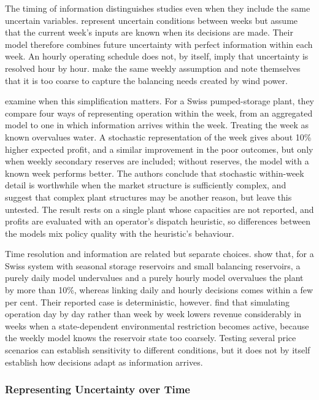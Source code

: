 The timing of information distinguishes studies even when they include
the same uncertain variables. \citet{bore2026assessing} represent
uncertain conditions between weeks but assume that the current week's
inputs are known when its decisions are made. Their model therefore
combines future uncertainty with perfect information within each week.
An hourly operating schedule does not, by itself, imply that uncertainty
is resolved hour by hour. \citet{helseth2013} make the same weekly
assumption and note themselves that it is too coarse to capture the
balancing needs created by wind power.

\citet{abgottspon2014} examine when this simplification matters. For a
Swiss pumped-storage plant, they compare four ways of representing
operation within the week, from an aggregated model to one in which
information arrives within the week. Treating the week as known
overvalues water. A stochastic representation of the week gives about
10\% higher expected profit, and a similar improvement in the poor
outcomes, but only when weekly secondary reserves are included; without
reserves, the model with a known week performs better. The authors
conclude that stochastic within-week detail is worthwhile when the
market structure is sufficiently complex, and suggest that complex plant
structures may be another reason, but leave this untested. The result
rests on a single plant whose capacities are not reported, and profits
are evaluated with an operator's dispatch heuristic, so differences
between the models mix policy quality with the heuristic's behaviour.

Time resolution and information are related but separate choices.
\citet{abgottspon2016multihorizon} show that, for a Swiss system with
seasonal storage reservoirs and small balancing reservoirs, a purely daily model undervalues
and a purely hourly model overvalues the plant by more than 10\%,
whereas linking daily and hourly decisions comes within a few per cent.
Their reported case is deterministic, however.
\citet{alic2023optimal} find that simulating operation day by day rather
than week by week lowers revenue considerably in weeks when a
state-dependent environmental restriction becomes active, because the
weekly model knows the reservoir state too coarsely. Testing several
price scenarios can establish sensitivity to different conditions, but
it does not by itself establish how decisions adapt as information
arrives.

\subsubsection{Representing Uncertainty over Time}
\label{sec:lit_unc_repr}

